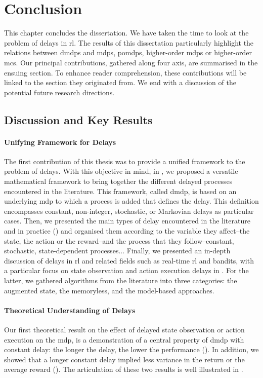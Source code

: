 \chapter{Conclusion}
\label{chap:conclusion}

This chapter concludes the dissertation. 
We have taken the time to look at the problem of delays in \gls{rl}.
The results of this dissertation particularly highlight the relations between \glspl{dmdp} and \glspl{mdp}, \glspl{pomdp}, higher-order \glspl{mdp} or higher-order \glspl{mc}.
Our principal contributions, gathered along four axis, are summarised in the ensuing section. 
To enhance reader comprehension, these contributions will be linked to the section they originated from.
We end with a discussion of the potential future research directions.

\section{Discussion and Key Results}
\subsubsection{Unifying Framework for Delays}
The first contribution of this thesis was to provide a unified framework to the problem of delays.
With this objective in mind, in , we proposed a versatile mathematical framework to bring together the different delayed processes encountered in the literature. 
This framework, called \gls{dmdp}, is based on an underlying \gls{mdp} to which a process is added that defines the delay.
This definition encompasses constant, non-integer, stochastic, or Markovian delays as particular cases. 
Then, we presented the main types of delay encountered in the literature and in practice () and organised them according to the variable they affect--the state, the action or the reward--and the process that they follow--constant, stochastic, state-dependent processes...
Finally, we presented an in-depth discussion of delays in \gls{rl} and related fields such as real-time \gls{rl} and bandits, with a particular focus on state observation and action execution delays in .
For the latter, we gathered algorithms from the literature into three categories: the augmented state, the memoryless, and the model-based approaches.

\subsubsection{Theoretical Understanding of Delays}
Our first theoretical result on the effect of delayed state observation or action execution on the \gls{mdp}, is a demonstration of a central property of \gls{dmdp} with constant delay: the longer the delay, the lower the performance ().
In addition, we showed that a longer constant delay implied less variance in the return or the average reward (). 
The articulation of these two results is well illustrated in .

